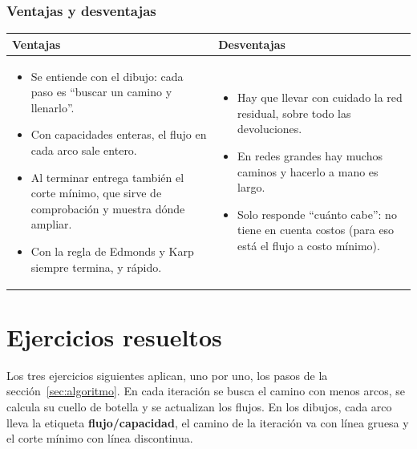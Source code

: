 \documentclass[11pt,a4paper]{article}
\begin{document}
\section{Ventajas y desventajas}

\begin{center}\small
\begin{tabular}{p{7.2cm}p{7.2cm}}
\toprule
\textbf{Ventajas} & \textbf{Desventajas} \\
\midrule
\begin{itemize}[leftmargin=*, itemsep=2pt, topsep=2pt]
  \item Se entiende con el dibujo: cada paso es ``buscar un camino y llenarlo''.
  \item Con capacidades enteras, el flujo en cada arco sale entero.
  \item Al terminar entrega también el corte mínimo, que sirve de comprobación y muestra dónde ampliar.
  \item Con la regla de Edmonds y Karp siempre termina, y rápido.
\end{itemize}
&
\begin{itemize}[leftmargin=*, itemsep=2pt, topsep=2pt]
  \item Hay que llevar con cuidado la red residual, sobre todo las devoluciones.
  \item En redes grandes hay muchos caminos y hacerlo a mano es largo.
  \item Solo responde ``cuánto cabe'': no tiene en cuenta costos (para eso está el flujo a costo mínimo).
\end{itemize}
\\
\bottomrule
\end{tabular}
\end{center}

\newpage
\part{Ejercicios resueltos}
\setcounter{section}{0}

Los tres ejercicios siguientes aplican, uno por uno, los pasos de la sección~\ref{sec:algoritmo}. En cada
iteración se busca el camino con menos arcos, se calcula su cuello de botella y se actualizan los flujos. En los
dibujos, cada arco lleva la etiqueta \textbf{flujo/capacidad}, el camino de la iteración va con línea gruesa y el
corte mínimo con línea discontinua.
\end{document}
